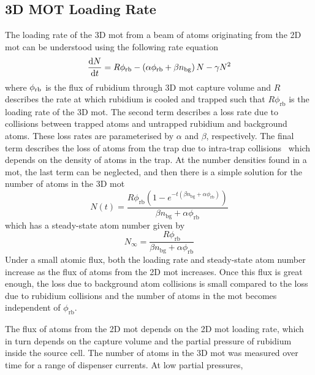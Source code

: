 \subsection{3D MOT Loading Rate}\label{subsec:loading_rate}
The loading rate of the 3D \ac{mot} from a beam of atoms originating from the 2D
\ac{mot} can be understood using the following rate equation
\begin{equation}
	\frac{\mathrm{d} N}{\mathrm{d}t} = R  \phi_\textnormal{rb} - \left(\alpha \phi_\textnormal{rb}  + \beta n_\textnormal{bg} \right) N - \gamma N^2
	\label{eq:loading_rate}
\end{equation}
where \(\phi_\textnormal{rb}\) is the flux of rubidium through 3D \ac{mot}
capture volume and \(R\) describes the rate at which rubidium is cooled and
trapped such that \( R \phi_\text{rb}\) is the loading rate of the 3D \ac{mot}.
The second term describes a loss rate due to collisions between trapped atoms
and untrapped rubidium and background atoms. These loss rates are parameterised
by \(\alpha\) and \(\beta\), respectively. The final term describes the loss of
atoms from the trap due to intra-trap collisions~\cite{Prentiss1988} which
depends on the density of atoms in the trap. 
At the number densities found in a \ac{mot}, the last term can be
neglected, and then there is a simple
solution for the number of atoms in the 3D \ac{mot}
\begin{equation}
	N(t) = \frac{R \phi _{\text{rb}} \left(1-e^{-t \left(\beta  n_{\text{bg}}+\alpha  \phi _{\text{rb}}\right)}\right)}{\beta  n_{\text{bg}}+\alpha  \phi _{\text{rb}}}
	\label{eq:atom_number}
\end{equation}
which has a steady-state atom number given by
\begin{equation}
	N_\infty = \frac{R \phi _{\text{rb}}}{\beta  n_{\text{bg}}+\alpha  \phi _{\text{rb}}}
\end{equation}
Under a small atomic flux, both the loading rate and steady-state atom number
increase as the flux of atoms from the 2D \ac{mot} increases. Once this flux is
great enough, the loss due to background atom collisions is small compared to
the loss due to rubidium collisions and the number of atoms in the
\ac{mot} becomes independent of
\(\phi_\text{rb}\). \par\noindent The flux of atoms from the 2D \ac{mot} depends on the 2D
\ac{mot} loading rate, which in turn depends on the capture volume and the partial pressure of rubidium inside the source cell. The number of atoms in the 3D \ac{mot} was measured over time for a range of dispenser currents. At low partial pressures,
